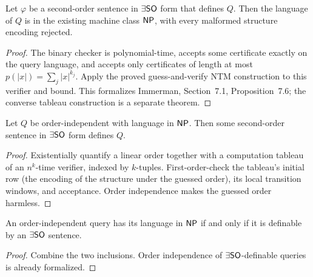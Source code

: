 \begin{theorem}
  \label{thm:desc-fagin-upper}
  \leanok
  Let $\varphi$ be a second-order sentence in $\exists\mathsf{SO}$ form that defines
  $Q$. Then the language of $Q$ is in the existing machine class $\mathsf{NP}$,
  with every malformed structure encoding rejected.
\end{theorem}
\begin{proof}
  \leanok
  The binary checker is polynomial-time, accepts some certificate exactly on
  the query language, and accepts only certificates of length at most
  $p(|x|)=\sum_j|x|^{k_j}$. Apply the proved guess-and-verify NTM construction to
  this verifier and bound. This formalizes Immerman, Section~7.1,
  Proposition~7.6; the converse tableau construction is a separate theorem.
\end{proof}

\begin{theorem}
  \label{thm:desc-fagin-lower}
  Let $Q$ be order-independent with language in $\mathsf{NP}$. Then some second-order
  sentence in $\exists\mathsf{SO}$ form defines $Q$.
\end{theorem}
\begin{proof}
  Existentially quantify a linear order together with a computation tableau of an
  $n^k$-time verifier, indexed by $k$-tuples. First-order-check the tableau's
  initial row (the encoding of the structure under the guessed order), its local
  transition windows, and acceptance. Order independence makes the guessed order
  harmless.
\end{proof}

\begin{theorem}
  \label{thm:desc-fagin}
  An order-independent query has its language in $\mathsf{NP}$ if and only if it is
  definable by an $\exists\mathsf{SO}$ sentence.
\end{theorem}
\begin{proof}
  Combine the two inclusions. Order independence of $\exists\mathsf{SO}$-definable
  queries is already formalized.
\end{proof}

